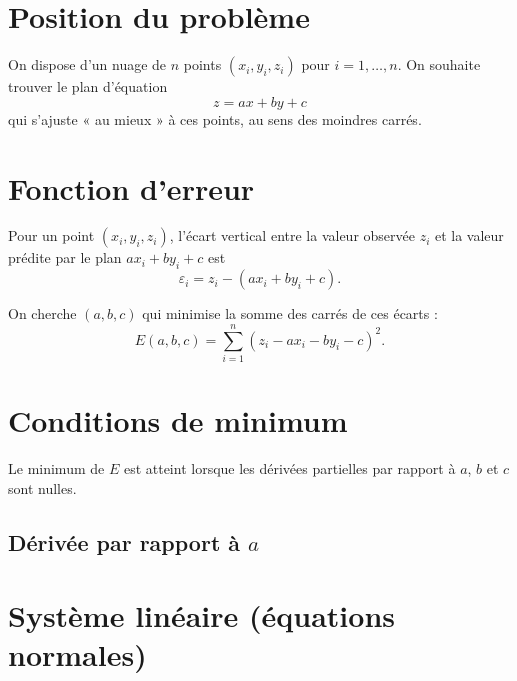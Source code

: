 

 


\section{Position du problème}

On dispose d'un nuage de $n$ points $(x_i, y_i, z_i)$ pour $i = 1, \dots, n$.
On souhaite trouver le plan d'équation
\[
z = a x + b y + c
\]
qui s'ajuste « au mieux » à ces points, au sens des moindres carrés.

\section{Fonction d'erreur}

Pour un point $(x_i, y_i, z_i)$, l'écart vertical entre la valeur observée $z_i$
et la valeur prédite par le plan $a x_i + b y_i + c$ est
\[
\varepsilon_i = z_i - (a x_i + b y_i + c).
\]

On cherche $(a, b, c)$ qui minimise la somme des carrés de ces écarts :
\[
E(a,b,c) = \sum_{i=1}^{n} \left( z_i - a x_i - b y_i - c \right)^2.
\]

\section{Conditions de minimum}

Le minimum de $E$ est atteint lorsque les dérivées partielles par rapport à
$a$, $b$ et $c$ sont nulles.

\subsection*{Dérivée par rapport à $a$}




\section{Système linéaire (équations normales)}

